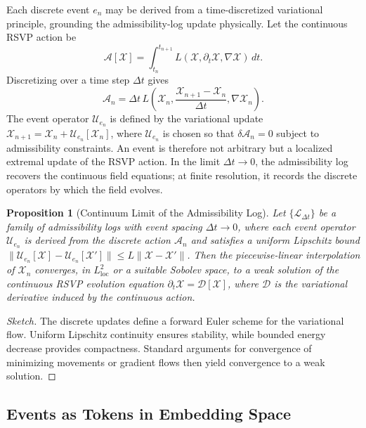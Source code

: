 \documentclass[11pt, a4paper, twocolumn]{article}
\newtheorem{proposition}[definition]{Proposition}
\newcommand{\X}{\mathcal{X}}
\begin{document}
Each discrete event $e_n$ may be derived from a time-discretized variational
principle, grounding the admissibility-log update physically. Let the
continuous RSVP action be
\[
    \mathcal{A}[\X]
    =
    \int_{t_n}^{t_{n+1}}
    L(\X,\partial_t\X,\nabla\X)\,dt.
\]
Discretizing over a time step $\Delta t$ gives
\[
    \mathcal{A}_n
    =
    \Delta t\,
    L\!\left(
        \X_n,
        \frac{\X_{n+1}-\X_n}{\Delta t},
        \nabla\X_n
    \right).
\]
The event operator $\mathcal{U}_{e_n}$ is defined by the variational update
$\X_{n+1} = \X_n + \mathcal{U}_{e_n}[\X_n]$, where $\mathcal{U}_{e_n}$ is
chosen so that $\delta \mathcal{A}_n = 0$ subject to admissibility constraints.
An event is therefore not arbitrary but a localized extremal update of the RSVP
action. In the limit $\Delta t \to 0$, the admissibility log recovers the
continuous field equations; at finite resolution, it records the discrete
operators by which the field evolves.

\begin{proposition}[Continuum Limit of the Admissibility Log]
Let $\{\mathcal{L}_{\Delta t}\}$ be a family of admissibility logs with event
spacing $\Delta t \to 0$, where each event operator $\mathcal{U}_{e_n}$ is
derived from the discrete action $\mathcal{A}_n$ and satisfies a uniform
Lipschitz bound $\|\mathcal{U}_{e_n}[\X] - \mathcal{U}_{e_n}[\X']\| \leq L
\|\X - \X'\|$. Then the piecewise-linear interpolation of $\X_n$ converges, in
$L^2_{\mathrm{loc}}$ or a suitable Sobolev space, to a weak solution of the
continuous RSVP evolution equation $\partial_t \X = \mathcal{D}[\X]$, where
$\mathcal{D}$ is the variational derivative induced by the continuous action.
\end{proposition}

\begin{proof}[Sketch]
The discrete updates define a forward Euler scheme for the variational flow.
Uniform Lipschitz continuity ensures stability, while bounded energy decrease
provides compactness. Standard arguments for convergence of minimizing movements
or gradient flows then yield convergence to a weak solution.
\end{proof}

\subsection{Events as Tokens in Embedding Space}
\end{document}
